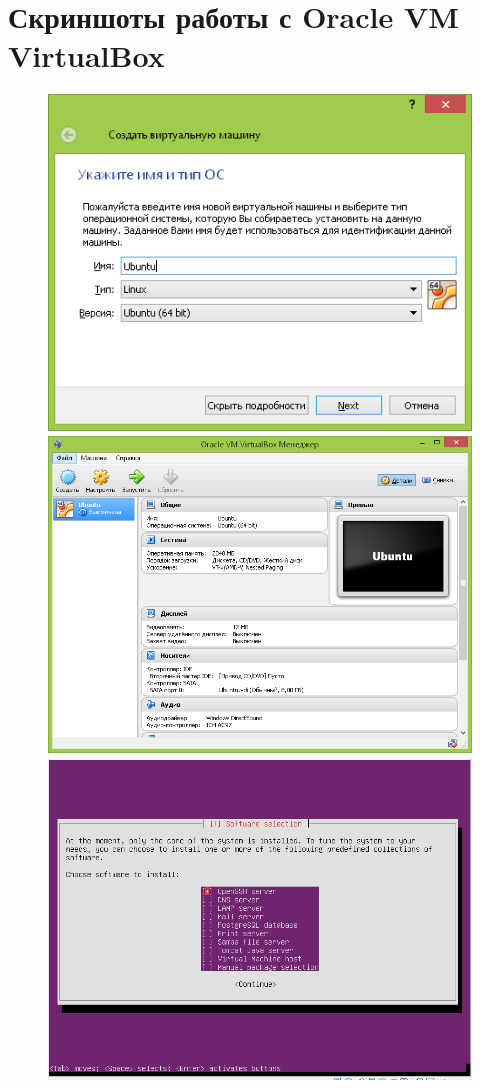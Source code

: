 \documentclass[a4paper, 14pt]{extreport}
\begin{document}
    \chapter{Скриншоты работы с Oracle VM VirtualBox}
    \begin{figure}[ht!]
        \center
        \includegraphics[width=.6\textwidth]{vbox_02} \\[.5em]
        \includegraphics[width=.6\textwidth]{vbox_08} \\[.5em]
        \includegraphics[width=.6\textwidth]{vbox_10}
    \end{figure}
\end{document}
